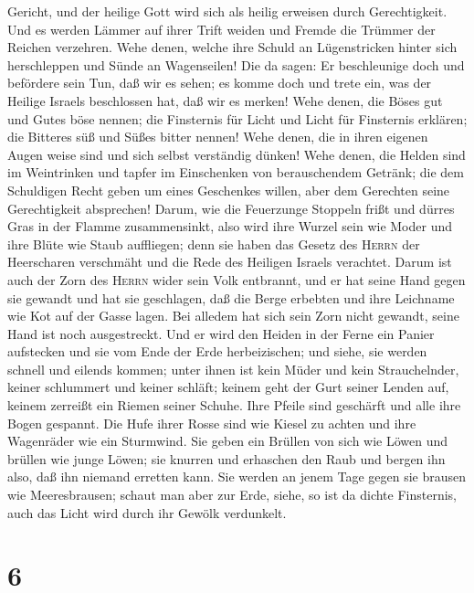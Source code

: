 Gericht, und der heilige Gott wird sich als heilig erweisen durch
Gerechtigkeit.  Und es werden Lämmer auf ihrer Trift
weiden und Fremde die Trümmer der Reichen verzehren. 
Wehe denen, welche ihre Schuld an Lügenstricken hinter sich herschleppen
und Sünde an Wagenseilen!  Die da sagen: Er beschleunige
doch und befördere sein Tun, daß wir es sehen; es komme doch und trete
ein, was der Heilige Israels beschlossen hat, daß wir es merken!
 Wehe denen, die Böses gut und Gutes böse nennen; die
Finsternis für Licht und Licht für Finsternis erklären; die Bitteres süß
und Süßes bitter nennen!  Wehe denen, die in ihren
eigenen Augen weise sind und sich selbst verständig dünken!
 Wehe denen, die Helden sind im Weintrinken und tapfer im
Einschenken von berauschendem Getränk;  die dem
Schuldigen Recht geben um eines Geschenkes willen, aber dem Gerechten
seine Gerechtigkeit absprechen!  Darum, wie die
Feuerzunge Stoppeln frißt und dürres Gras in der Flamme zusammensinkt,
also wird ihre Wurzel sein wie Moder und ihre Blüte wie Staub
auffliegen; denn sie haben das Gesetz des \textsc{Herrn} der Heerscharen
verschmäht und die Rede des Heiligen Israels verachtet. 
Darum ist auch der Zorn des \textsc{Herrn} wider sein Volk entbrannt,
und er hat seine Hand gegen sie gewandt und hat sie geschlagen, daß die
Berge erbebten und ihre Leichname wie Kot auf der Gasse lagen. Bei
alledem hat sich sein Zorn nicht gewandt, seine Hand ist noch
ausgestreckt.  Und er wird den Heiden in der Ferne ein
Panier aufstecken und sie vom Ende der Erde herbeizischen; und siehe,
sie werden schnell und eilends kommen;  unter ihnen ist
kein Müder und kein Strauchelnder, keiner schlummert und keiner schläft;
keinem geht der Gurt seiner Lenden auf, keinem zerreißt ein Riemen
seiner Schuhe.  Ihre Pfeile sind geschärft und alle ihre
Bogen gespannt. Die Hufe ihrer Rosse sind wie Kiesel zu achten und ihre
Wagenräder wie ein Sturmwind.  Sie geben ein Brüllen von
sich wie Löwen und brüllen wie junge Löwen; sie knurren und erhaschen
den Raub und bergen ihn also, daß ihn niemand erretten kann.
 Sie werden an jenem Tage gegen sie brausen wie
Meeresbrausen; schaut man aber zur Erde, siehe, so ist da dichte
Finsternis, auch das Licht wird durch ihr Gewölk verdunkelt.

\hypertarget{section-5}{%
\section{6}\label{section-5}}

